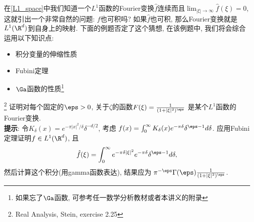 在\ref{L1_space}中我们知道一个$L^1$函数的Fourier变换$\hat{f}$连续而且$\lim_{|\xi|\to \infty}\hat{f}(\xi) = 0$, 这就引出一个非常自然的问题: $\hat{f}$也可积吗? 如果$\hat{f}$也可积, 那么Fourier变换就是$L^1(\R^d)$到自身上的映射. 下面的例题否定了这个猜想, 在该例题中, 我们将会综合运用以下知识点:
\begin{itemize}
    \item 积分变量的伸缩性质
    \item Fubini定理
    \item $\Ga$函数的性质\footnote{如果忘了$\Ga$函数, 可参考任一数学分析教材或者本讲义的附录}
    
\end{itemize}
\begin{example}\footnote{Real Analysis, Stein, exercise 2.25}
    {\everymath{\displaystyle}
    证明对每个固定的$\eps > 0$, 关于$\zeta$的函数$F(\xi)=\frac{1}{(1+|\xi|^2)^\eps}$
    是某个$L^1$函数的Fourier变换. \\
    \textbf{提示}: 令$K_\delta(x)=e^{-\pi|x|^2/\delta} \delta^{-d/2}$, 考虑
    $f(x)=\int_0^\infty K_\delta(x)e^{-\pi \delta}\delta^{\eps-1} d\delta$. 
    应用Fubini定理证明$f \in L^1(\R^d)$, 且$$\hat{f}(\xi) = \int_0^\infty e^{-\pi \delta |\xi|^2} e^{-\pi \delta} \delta^{\eps-1} d\delta, $$
    然后计算这个积分(用gamma函数表达), 结果应为
    $\pi^{-\eps}\Gamma(\eps)\frac{1}{(1+|\xi|^2)^\eps}$.
    }
\end{example}
